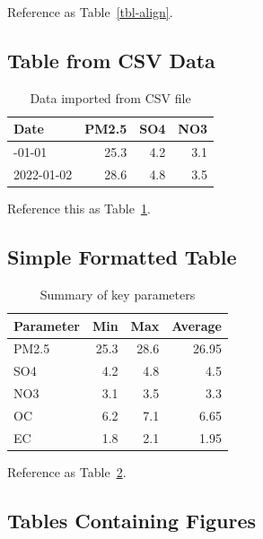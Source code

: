 \documentclass[
  letterpaper,
  oneside,
  openany]{MastersDoctoralThesis}
\theoremstyle{plain}
\theoremstyle{remark}
\begin{document}
Reference as Table~\ref{tbl-align}.

\subsection*{Table from CSV Data}\label{table-from-csv-data}

\begin{longtable}[]{@{}lrrr@{}}

\caption{\label{tbl-csv}Data imported from CSV file}

\tabularnewline

\toprule\noalign{}
Date & PM2.5 & SO4 & NO3 \\
\midrule\noalign{}
\endhead
\bottomrule\noalign{}
\endlastfoot
2022-01-01 & 25.3 & 4.2 & 3.1 \\
2022-01-02 & 28.6 & 4.8 & 3.5 \\

\end{longtable}

Reference this as Table~\ref{tbl-csv}.

\subsection*{Simple Formatted Table}\label{simple-formatted-table}

\begin{longtable}[]{@{}lrrr@{}}

\caption{\label{tbl-simple-data}Summary of key parameters}

\tabularnewline

\toprule\noalign{}
Parameter & Min & Max & Average \\
\midrule\noalign{}
\endhead
\bottomrule\noalign{}
\endlastfoot
PM2.5 & 25.3 & 28.6 & 26.95 \\
SO4 & 4.2 & 4.8 & 4.5 \\
NO3 & 3.1 & 3.5 & 3.3 \\
OC & 6.2 & 7.1 & 6.65 \\
EC & 1.8 & 2.1 & 1.95 \\

\end{longtable}

Reference as Table~\ref{tbl-simple-data}.

\subsection*{Tables Containing Figures}\label{tables-containing-figures}
\end{document}
